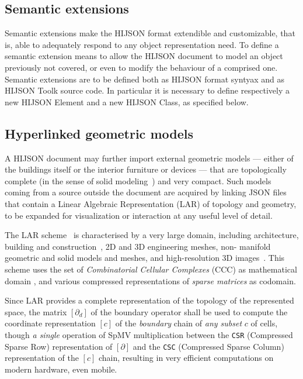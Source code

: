 \documentclass{sig-alternate}
\begin{document}
\subsection{Semantic extensions}\label{semantic-extensions}

Semantic extensions make the HIJSON format extendible and customizable, that is, able to 
adequately respond to any object representation need. To define a semantic extension means to allow the HIJSON document to model an object previously not covered, or even to modify the behaviour of a comprised one. Semantic extensions are to be defined both as HIJSON format syntyax and as HIJSON Toolk source code. In particular it is necessary to define respectively a new HIJSON Element and a new HIJSON Class, as specified below.

\subsection{Hyperlinked geometric models}\label{optional-lar}

A HIJSON document may further import external geometric models --- either of the
buildings itself or the interior furniture or devices --- that are topologically
complete (in the sense of solid
modeling~\cite{Requicha:1980:RRS:356827.356833}) and very compact.  Such
models coming from a source outside the document are acquired by linking JSON
files that contain a Linear Algebraic Representation (LAR) of topology and
geometry, to be expanded for visualization or interaction at any useful level
of detail.

The LAR scheme~\cite{Dicarlo:2014:TNL:2543138.2543294} is characterised by a
very large domain, including architecture, building and
construction~\cite{paoluzziMS:2014}, 2D and 3D engineering meshes, non-
manifold geometric and solid models and meshes, and high-resolution 3D
images~\cite{cadanda:2015}. This scheme uses the set of \emph{Combinatorial
Cellular Complexes} (CCC) as mathematical domain \cite{Basak:2010}, and
various compressed representations of \emph{sparse matrices} \cite{gemmexp} as
codomain.

Since LAR provides a complete representation of the topology of the
represented space, the matrix  $[\partial_d]$ of the boundary operator shall
be used to compute the coordinate representation $[c]$ of the \emph{boundary}
chain of \emph{any subset} $c$ of cells, though \emph{a single} operation of
SpMV multiplication \cite{gemmexp} between the \texttt{CSR} (Compressed Sparse
Row) representation of $[\partial]$ and the \texttt{CSC} (Compressed Sparse
Column) representation of the $[c]$ chain, resulting in very efficient
computations on modern hardware, even mobile.
\end{document}
